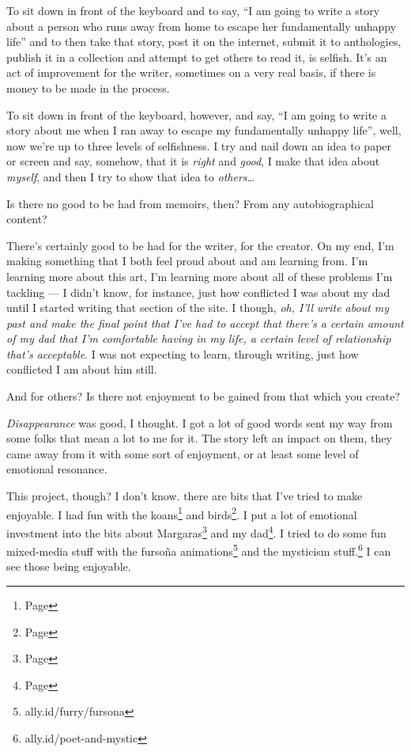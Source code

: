 \begin{paracol}{2}
\begin{leftcolumn}
To sit down in front of the keyboard and to say, ``I am going to write a story about a person who runs away from home to escape her fundamentally unhappy life'' and to then take that story, post it on the internet, submit it to anthologies, publish it in a collection and attempt to get others to read it, is selfish. It's an act of improvement for the writer, sometimes on a very real basis, if there is money to be made in the process.

To sit down in front of the keyboard, however, and say, ``I am going to write a story about me when I ran away to escape my fundamentally unhappy life'', well, now we're up to three levels of selfishness. I try and nail down an idea to paper or screen and say, somehow, that it is \emph{right} and \emph{good}, I make that idea about \emph{myself}, and then I try to show that idea to \emph{others}\ldots{}

\begin{ally}
Is there no good to be had from memoirs, then? From any autobiographical content?
\end{ally}
There's certainly good to be had for the writer, for the creator. On my end, I'm making something that I both feel proud about and am learning from. I'm learning more about this art, I'm learning more about all of these problems I'm tackling --- I didn't know, for instance, just how conflicted I was about my dad until I started writing that section of the site. I though, \emph{oh, I'll write about my past and make the final point that I've had to accept that there's a certain amount of my dad that I'm comfortable having in my life, a certain level of relationship that's acceptable}. I was not expecting to learn, through writing, just how conflicted I am about him still.

\begin{ally}
And for others? Is there not enjoyment to be gained from that which you create?
\end{ally}
\emph{Disappearance} was good, I thought. I got a lot of good words sent my way from some folks that mean a lot to me for it. The story left an impact on them, they came away from it with some sort of enjoyment, or at least some level of emotional resonance.

This project, though? I don't know. there are bits that I've tried to make enjoyable. I had fun with the koans\footnote{Page \pageref{koan}} and birds\footnote{Page \pageref{birds}}. I put a lot of emotional investment into the bits about Margaras\footnote{Page \pageref{furry:margaras}} and my dad\footnote{Page \pageref{dad}}. I tried to do some fun mixed-media stuff with the fursoña animations\footnote{ally.id/furry/fursona} and the mysticism stuff.\footnote{ally.id/poet-and-mystic} I can see those being enjoyable.


\end{leftcolumn}
\end{paracol}
